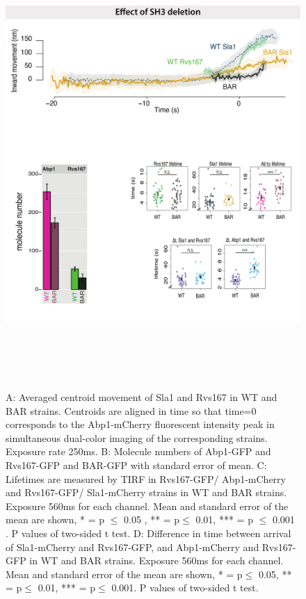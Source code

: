 \begin{figure}
	\centering
\includegraphics[width=17cm,height=17cm,keepaspectratio]{figures/results_final/delsh3}
	\caption [Effect of the Rvs167 SH3 deletion]
	{A: Averaged centroid movement of Sla1 and Rvs167 in WT and BAR strains. Centroids are aligned in time so that time=0 corresponds to the Abp1-mCherry fluorescent intensity peak in simultaneous dual-color imaging of the corresponding strains. Exposure rate 250ms.
B: Molecule numbers of Abp1-GFP and Rvs167-GFP and BAR-GFP with standard error of mean. 
C: Lifetimes are measured by TIRF in Rvs167-GFP/ Abp1-mCherry and Rvs167-GFP/ Sla1-mCherry strains in WT and BAR strains. Exposure 560ms for each channel. Mean and standard error of the mean are shown,  * = p $\leq$ 0.05 , ** = p$\leq$ 0.01, *** = p $\leq$ 0.001 . P values of two-sided t test. 
D: Difference in time between arrival of Sla1-mCherry and Rvs167-GFP, and Abp1-mCherry and Rvs167-GFP in WT and BAR strains. Exposure 560ms for each channel. Mean and standard error of the mean are shown, * = p$\leq$ 0.05, ** = p$\leq$ 0.01, *** = p$\leq$ 0.001. P values of two-sided t test.\label{fig2_sh3del}}
\end{figure}
	\vspace{5mm}
	
